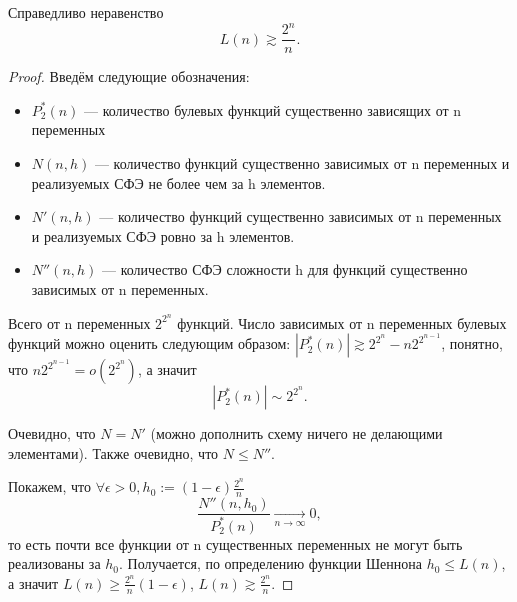 \begin{theorem}
	Справедливо неравенство \[
		L(n) \gtrsim \frac{2^n}{n}
	.\] 
\end{theorem}
\begin{proof}
Введём следующие обозначения:
\begin{itemize}
	\item $P_2^*(n)$ --- количество булевых функций существенно зависящих от n
		переменных
	\item $N(n, h)$ --- количество функций существенно зависимых от n
		переменных и реализуемых СФЭ не более чем за h элементов.
	\item $N'(n, h)$ --- количество функций существенно зависимых от n
		переменных и реализуемых СФЭ ровно за h элементов.
	\item $N''(n, h)$ --- количество СФЭ сложности h для функций существенно
		зависимых от n переменных.
\end{itemize}
Всего от n переменных $2^{2^n}$ функций. Число зависимых от n переменных булевых
функций можно оценить следующим образом: $|P_2^*(n)| \gtrsim 2^{2^n} - n
2^{2^{n-1}}$, понятно, что $n 2^{2^{n-1}} = o(2^{2^n})$, а значит \[|P_2^*(n)|
\sim 2^{2^n}.\] 

Очевидно, что $N = N'$ (можно дополнить схему ничего не делающими элементами).
Также очевидно, что $N \le N''$. 

Покажем, что  $\forall \epsilon >0, h_0:=\left( 1-\epsilon \right) \frac{2^n}{n}$  \[
	\frac{N''(n,h_0)}{P_2^*(n)} \to\limits_{n \to \infty} 0
,\] то есть почти все функции от n существенных переменных не могут быть
реализованы за $h_0$. Получается, по определению функции Шеннона $h_0 \le L(n)$,
а значит $L(n) \ge \frac{2^n}{n}\left( 1-\epsilon \right) $, $L(n)\gtrsim
\frac{2^n}{n}$.


\end{proof}
